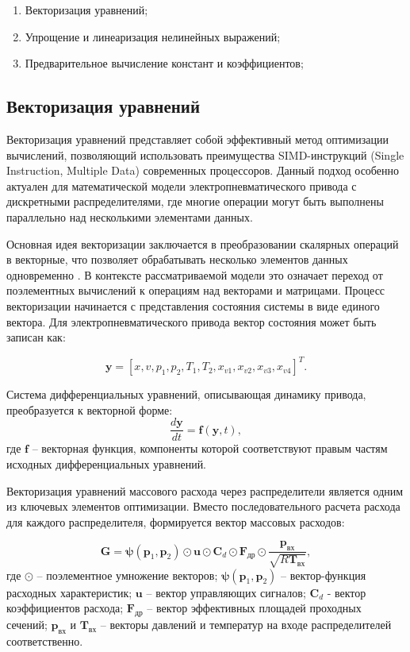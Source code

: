 \begin{enumerate}
    \item Векторизация уравнений;
    \item Упрощение и линеаризация нелинейных выражений;
    \item Предварительное вычисление констант и коэффициентов;
\end{enumerate}

\subsection{Векторизация уравнений}\label{sec:ch2/sec5/subsec1}
Векторизация уравнений представляет собой эффективный метод оптимизации вычислений,
позволяющий использовать преимущества SIMD-инструкций (Single Instruction, Multiple Data)
современных процессоров. Данный подход особенно актуален для математической
модели электропневматического привода с дискретными распределителями, где многие операции могут быть выполнены
параллельно \cite*{eichenberger2004simd} над несколькими элементами данных.

Основная идея векторизации заключается в преобразовании скалярных операций в
векторные, что позволяет обрабатывать несколько элементов данных
одновременно \cite*{nuzman2011vaporsimd}. В контексте рассматриваемой модели это означает переход от
поэлементных вычислений к операциям над векторами и матрицами.
Процесс векторизации начинается с представления состояния системы
в виде единого вектора. Для электропневматического привода
вектор состояния может быть записан как:

\begin{equation}
    \mathbf{y} = [x, v, p_1, p_2, T_1, T_2, x_{v1}, x_{v2}, x_{v3}, x_{v4}]^T.
\end{equation}

Система дифференциальных уравнений, описывающая динамику привода, преобразуется к векторной форме:
\begin{equation*}
    \frac{d\mathbf{y}}{dt} = \mathbf{f}(\mathbf{y}, t),
\end{equation*}
где $\mathbf{f}$ -- векторная функция, компоненты которой соответствуют правым частям исходных дифференциальных уравнений.

Векторизация уравнений массового расхода через распределители является одним из ключевых
элементов оптимизации. Вместо последовательного расчета расхода для
каждого распределителя, формируется вектор массовых расходов:

\begin{equation*}
    \mathbf{G} = \boldsymbol{\psi}(\mathbf{p}_1, \mathbf{p}_2) \odot \mathbf{u} \odot \mathbf{C}_d \odot \mathbf{F}_\text{др} \odot \frac{\mathbf{p}_{\text{вх}}}{\sqrt{R\mathbf{T}_{\text{вх}}}},
\end{equation*}
где $\odot$ -- поэлементное умножение векторов;
$\boldsymbol{\psi}(\mathbf{p}_1, \mathbf{p}_2)$ -- вектор-функция расходных характеристик;
$\mathbf{u}$ -- вектор управляющих сигналов;
$\mathbf{C}_d$ - вектор коэффициентов расхода;
$\mathbf{F}_\text{др}$ -- вектор эффективных площадей проходных сечений;
$\mathbf{p}_{вх}$ и $\mathbf{T}_{вх}$ -- векторы давлений и температур на входе распределителей соответственно.

